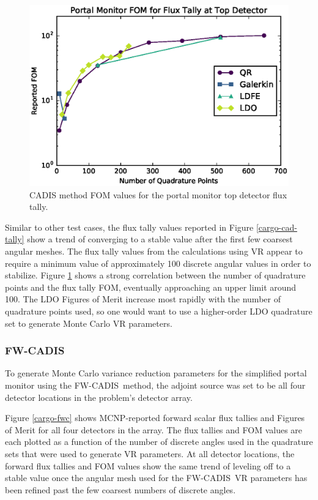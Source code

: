 \documentclass{article} %
\newcommand{\fwc}{\mbox{FW-CADIS}}
\begin{document}
\begin{figure}[!htb]
\centering
\includegraphics[max height=0.445\textheight]{portal-cadis-fom.eps}
\caption{CADIS method FOM values for the portal monitor top detector flux tally.}
\label{cargo-cad-fom}
\end{figure}

Similar to other test cases, the flux tally values reported in Figure 
\ref{cargo-cad-tally} show a trend of converging to a stable value after the
first few coarsest angular meshes. The flux tally values from the
calculations using VR appear to require a minimum value of approximately 100
discrete angular values in order to stabilize. Figure \ref{cargo-cad-fom}
shows a strong correlation between the number of quadrature points and the
flux tally FOM, eventually approaching an upper limit around 100. The LDO
Figures of Merit increase most rapidly with the number of quadrature points
used, so one would want to use a higher-order LDO quadrature set to generate
Monte Carlo VR parameters.

\FloatBarrier
\subsubsection{\fwc}

To generate Monte Carlo variance reduction parameters for the simplified portal
monitor using the \fwc\ method, the adjoint source was set to be all four
detector locations in the problem's detector array.

Figure \ref{cargo-fwc} shows MCNP-reported forward scalar flux tallies and
Figures of Merit for all four detectors in the array. The flux tallies and FOM
values are each plotted as a function of the number of discrete angles used in
the quadrature sets that were used to generate VR parameters. At all
detector locations, the forward flux tallies and FOM values show the same
trend of leveling off to a stable value once the angular mesh used for the
\fwc\ VR parameters has been refined past the few coarsest numbers of discrete
angles.
\end{document}
